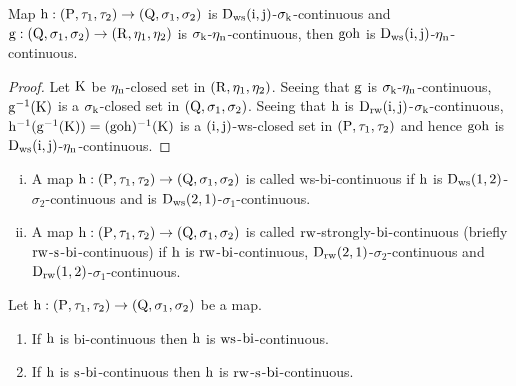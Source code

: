 \begin{thm}\label{thm7.4.29}
Map $\mathrm{h}:(\mathrm{P}, \tau_1, \tau_2 )\to (\mathrm{Q}, \sigma_{1}, \sigma_{2} )$ is $\mathrm{D}_{\mathrm{ws}} (\mathrm{i}, \mathrm{j})$-$\sigma_{\mathrm{k}}$-continuous and $\mathrm{g}: (\mathrm{Q}, \sigma_{1}, \sigma_{2} )\to (\mathrm{R}, \eta_{1}, \eta_{2})$ is $\sigma_{\mathrm{k}}$-$\eta_{\mathrm{n}}$-continuous, then $\mathrm{goh}$ is $\mathrm{D}_{\mathrm{ws}} (\mathrm{i}, \mathrm{j})$-$\eta_{\mathrm{n}}$-continuous.
\end{thm}

\begin{proof}
Let $\mathrm{K}$ be $\eta_{\mathrm{n}}$-closed set in $(\mathrm{R}, \eta_{1}, \eta_{2} )$. Seeing that $\mathrm{g}$ is $\sigma_{\mathrm{k}}$-$\eta_{\mathrm{n}}$-continuous, $\mathrm{g}^{-1}(\mathrm{K})$ is a $\sigma_{\mathrm{k}}$-closed set in $(\mathrm{Q}, \sigma_{1}, \sigma_{2} )$. Seeing that $\mathrm{h}$ is $\mathrm{D}_{\mathrm{rw}}(\mathrm{i}, \mathrm{j})$-$\sigma_{\mathrm{k}}$-continuous, $\mathrm{h}^{-1} (\mathrm{g}^{-1}(\mathrm{K}))= (\mathrm{goh})^{-1} (\mathrm{K})$ is a $(\mathrm{i},\mathrm{j})$-ws-closed set in $(\mathrm{P}, \tau_1, \tau_2 )$ and hence $\mathrm{goh}$ is $\mathrm{D}_{\mathrm{ws}} (\mathrm{i}, \mathrm{j})$-$\eta_{\mathrm{n}}$-continuous.
\end{proof}

\begin{dfn}\label{defi7.4.30}
\begin{enumerate}[(i)]
\item A map $\mathrm{h}:(\mathrm{P}, \tau_1, \tau_2 )\to (\mathrm{Q}, \sigma_{1}, \sigma_{2} )$ is called ws-bi-continuous if $\mathrm{h}$ is $\mathrm{D}_{\mathrm{ws}} (1,2)$-$\sigma_{2}$-continuous and is $\mathrm{D}_{\mathrm{ws}} (2, 1)$-$\sigma_{1}$-continuous.

\item A map $\mathrm{h}:(\mathrm{P}, \tau_1, \tau_2 )\to (\mathrm{Q}, \sigma_{1}, \sigma_{2} )$ is called $\mathrm{rw}$-strongly-$\mathrm{bi}$-continuous (briefly $\mathrm{rw}$-$\mathrm{s}$-$\mathrm{bi}$-continuous) if $\mathrm{h}$ is $\mathrm{rw}$-$\mathrm{bi}$-continuous, $\mathrm{D}_{\mathrm{rw}} (2, 1)$-$\sigma_{2}$-continuous and\break $\mathrm{D}_{\mathrm{rw}}(1, 2)$-$\sigma_{1}$-continuous.
\end{enumerate}
\end{dfn}

\begin{thm}\label{thm7.4.31}
Let $\mathrm{h}: (\mathrm{P}, \tau_1, \tau_2 )\to (\mathrm{Q}, \sigma_{1}, \sigma_{2} )$ be a map.
\begin{enumerate}[(1)]
\item If $\mathrm{h}$ is bi-continuous then $\mathrm{h}$ is $\mathrm{ws}$-$\mathrm{bi}$-continuous.
\item If $\mathrm{h}$ is $\mathrm{s}$-$\mathrm{bi}$-continuous then $\mathrm{h}$ is $\mathrm{rw}$-$\mathrm{s}$-$\mathrm{bi}$-continuous.
\end{enumerate}
\end{thm}

